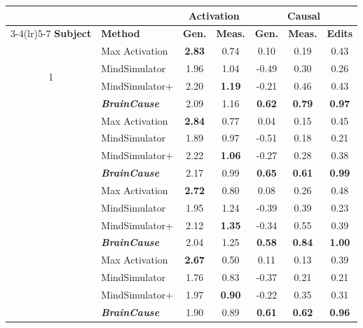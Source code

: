 \documentclass{llmxive}
\begin{document}
\begin{table}[ht]
\centering
\setlength{\tabcolsep}{4pt}
\vspace{+0.92cm}
\begin{tabular}{@{}clccccc@{}}
\toprule
& 
& \multicolumn{2}{c}{\textbf{Activation}}
& \multicolumn{3}{c}{\textbf{Causal}} \\
\cmidrule(lr){3-4}\cmidrule(lr){5-7}
\textbf{Subject}
& \textbf{Method}
& \textbf{Gen.}
& \textbf{Meas.}
& \textbf{Gen.}
& \textbf{Meas.}
& \textbf{Edits} \\
\midrule

\multirow{4}{*}{1}
& Max Activation
& \textbf{2.83} & 0.74 & 0.10 & 0.19 & 0.43 \\
& MindSimulator
& 1.96 & 1.04 & -0.49 & 0.30 & 0.26 \\
& MindSimulator+
& 2.20 & \textbf{1.19} & -0.21 & 0.46 & 0.43 \\
& \emph{\textbf{BrainCause}}
& 2.09 & 1.16 & \textbf{0.62} & \textbf{0.79} & \textbf{0.97} \\

\addlinespace[2pt]
\midrule

\multirow{4}{*}{2}
& Max Activation
& \textbf{2.84} & 0.77 & 0.04 & 0.15 & 0.45 \\
& MindSimulator
& 1.89 & 0.97 & -0.51 & 0.18 & 0.21 \\
& MindSimulator+
& 2.22 & \textbf{1.06} & -0.27 & 0.28 & 0.38 \\
& \emph{\textbf{BrainCause}}
& 2.17 & 0.99 & \textbf{0.65} & \textbf{0.61} & \textbf{0.99} \\

\addlinespace[2pt]
\midrule

\multirow{4}{*}{5}
& Max Activation
& \textbf{2.72} & 0.80 & 0.08 & 0.26 & 0.48 \\
& MindSimulator
& 1.95 & 1.24 & -0.39 & 0.39 & 0.23 \\
& MindSimulator+
& 2.12 & \textbf{1.35} & -0.34 & 0.55 & 0.39 \\
& \emph{\textbf{BrainCause}}
& 2.04 & 1.25 & \textbf{0.58} & \textbf{0.84} & \textbf{1.00} \\

\addlinespace[2pt]
\midrule

\multirow{4}{*}{7}
& Max Activation
& \textbf{2.67} & 0.50 & 0.11 & 0.13 & 0.39 \\
& MindSimulator
& 1.76 & 0.83 & -0.37 & 0.21 & 0.21 \\
& MindSimulator+
& 1.97 & \textbf{0.90} & -0.22 & 0.35 & 0.31 \\
& \emph{\textbf{BrainCause}}
& 1.90 & 0.89 & \textbf{0.61} & \textbf{0.62} & \textbf{0.96} \\


\end{tabular}
\end{table}
\end{document}
